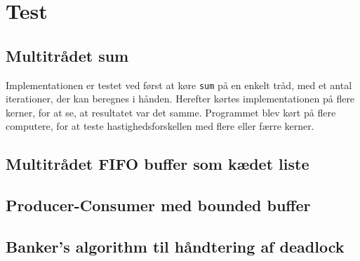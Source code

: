 \section{Test}

\subsection{Multitrådet sum}
Implementationen er testet ved først at køre \texttt{sum} på en enkelt tråd, med et antal iterationer, der kan beregnes i hånden.
Herefter kørtes implementationen på flere kerner, for at se, at resultatet var det samme. 
Programmet blev kørt på flere computere, for at teste hastighedsforskellen med flere eller færre kerner. 

\subsection{Multitrådet FIFO buffer som kædet liste}

\subsection{Producer-Consumer med bounded buffer}

\subsection{Banker's algorithm til håndtering af deadlock}
